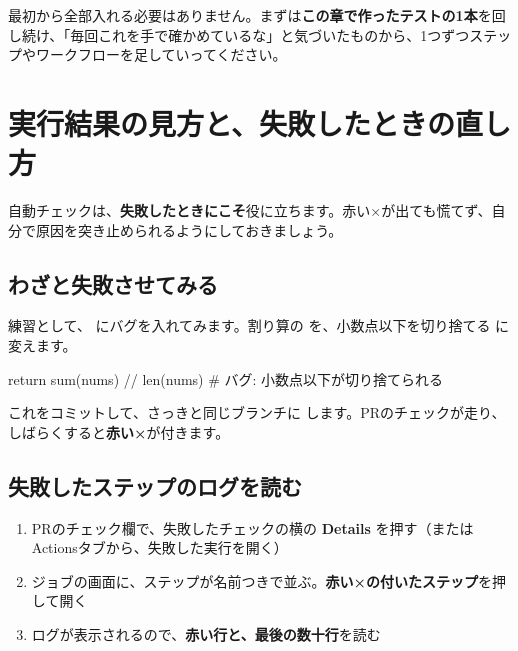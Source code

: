 \medskip

最初から全部入れる必要はありません。まずは\textbf{この章で作ったテストの1本}を回し続け、「毎回これを手で確かめているな」と気づいたものから、1つずつステップやワークフローを足していってください。

\section{実行結果の見方と、失敗したときの直し方}

自動チェックは、\textbf{失敗したときにこそ}役に立ちます。赤い×が出ても慌てず、自分で原因を突き止められるようにしておきましょう。

\subsection{わざと失敗させてみる}

練習として、 にバグを入れてみます。割り算の \cmd{/} を、小数点以下を切り捨てる \cmd{//} に変えます。

\begin{codebox}[python]
\begin{code}
    return sum(nums) // len(nums)   # バグ: 小数点以下が切り捨てられる
\end{code}
\end{codebox}

これをコミットして、さっきと同じブランチに  します。PRのチェックが走り、しばらくすると\textbf{赤い×}が付きます。

\subsection{失敗したステップのログを読む}

\begin{enumerate}[leftmargin=1.6em]
  \item PRのチェック欄で、失敗したチェックの横の \textbf{Details} を押す（またはActionsタブから、失敗した実行を開く）
  \item ジョブの画面に、ステップが名前つきで並ぶ。\textbf{赤い×の付いたステップ}を押して開く
  \item ログが表示されるので、\textbf{赤い行と、最後の数十行}を読む
\end{enumerate}

